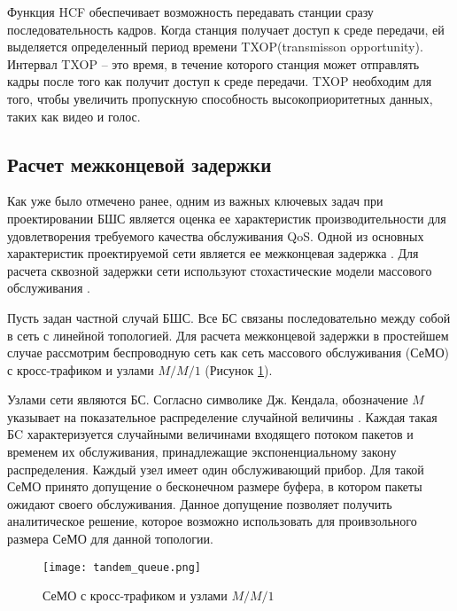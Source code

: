 Функция HCF обеспечивает возможность передавать станции сразу последовательность кадров. Когда станция получает доступ к среде передачи, ей выделяется определенный период времени TXOP(transmisson opportunity). Интервал TXOP  -- это время, в течение которого станция может отправлять кадры после того как получит доступ к среде передачи. TXOP необходим для того, чтобы увеличить пропускную способность высокоприоритетных данных, таких как видео и голос.



\subsection{Расчет межконцевой задержки}\label{part4_e2e_delay_section}

Как уже было отмечено ранее, одним из важных ключевых задач при проектировании БШС является оценка ее характеристик производительности для удовлетворения требуемого качества обслуживания QoS. Одной из основных характеристик проектируемой сети является ее межконцевая задержка \cite{Vishnevsky2016_Methods_of_performance, Wang2017, Liu2016, Chen2019, Hosni2017, Capone2019, Abbas2017, Seliem2019, Malandra2018, Kalor2018, Larionov2019, Gao2016}. Для расчета сквозной задержки сети используют стохастические модели массового обслуживания \cite{Vishnevsky2016_Methods_of_performance, Wang2017, Liu2016, Malandra2018, Larionov2019, Gao2016}. 

Пусть задан частной случай БШС. Все БС связаны последовательно между собой в сеть с линейной топологией. Для расчета межконцевой задержки в простейшем случае рассмотрим беспроводную сеть как сеть массового обслуживания (СеМО) с кросс-трафиком и узлами $M/M/1$ (Рисунок \cref{fig:tandem_queue}). 

Узлами сети являются БС. Согласно символике Дж. Кендала, обозначение $M$ указывает на показательное распределение случайной величины \cite{VishnevskyBook, Kleinrock1975}. Каждая такая БC характеризуется случайными величинами входящего потоком пакетов и временем их обслуживания, принадлежащие экспоненциальному закону распределения. Каждый узел имеет один обслуживающий прибор. Для такой СеМО принято допущение о бесконечном размере буфера, в котором пакеты ожидают своего обслуживания. Данное допущение позволяет получить аналитическое решение, которое возможно использовать для проивзольного размера СеМО для данной топологии.

\begin{figure}[h!]
  \centering
   \texttt{[image: tandem\_queue.png]}
\caption{СеМО с кросс-трафиком и узлами $M/M/1$}
\label{fig:tandem_queue}
\end{figure}


